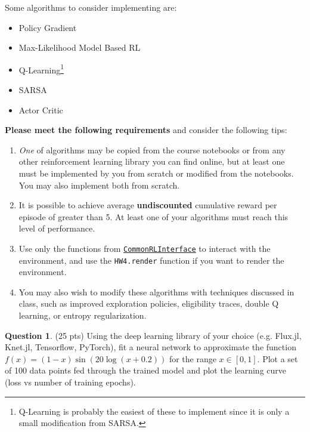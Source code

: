 \documentclass{article}
\theoremstyle{definition}
\newtheorem{question}[thm]{Question}
\begin{document}
Some algorithms to consider implementing are:
    \begin{itemize}[noitemsep]
        \item Policy Gradient
        \item Max-Likelihood Model Based RL
        \item Q-Learning\footnote{Q-Learning is probably the easiest of these to implement since it is only a small modification from SARSA.}
        \item SARSA
        \item Actor Critic
    \end{itemize}
    \textbf{Please meet the following requirements} and consider the following tips:
    \begin{enumerate}
        \item \emph{One} of algorithms may be copied from the course notebooks or from any other reinforcement learning library you can find online, but at least one must be implemented by you from scratch or modified from the notebooks. You may also implement both from scratch.
        \item It is possible to achieve average \textbf{undiscounted} cumulative reward per episode of greater than 5. At least one of your algorithms must reach this level of performance.
        \item Use only the functions from \href{https://github.com/JuliaReinforcementLearning/CommonRLInterface.jl}{\texttt{CommonRLInterface}} to interact with the environment, and use the \texttt{HW4.render} function if you want to render the environment.
        \item You may also wish to modify these algorithms with techniques discussed in class, such as improved exploration policies, eligibility traces, double Q learning, or entropy regularization.
    \end{enumerate}

\begin{question}
(25 pts) Using the deep learning library of your choice (e.g. Flux.jl, Knet.jl, Tensorflow, PyTorch), fit a neural network to approximate the function $f(x) = (1-x) \sin(20 \log(x+0.2))$ for the range $x \in [0,1]$. Plot a set of 100 data points fed through the trained model and plot the learning curve (loss vs number of training epochs).
\end{question}
\end{document}
